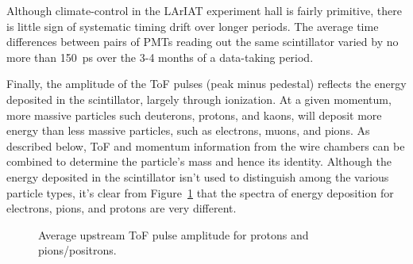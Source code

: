 Although climate-control in the LArIAT experiment hall is fairly primitive, there is little sign of systematic timing drift over longer periods. The average time differences between pairs of PMTs reading out the same scintillator varied by no more than 150~ps over the 3-4 months of a data-taking period.

Finally, the amplitude of the ToF pulses (peak minus pedestal) reflects the energy deposited in the scintillator, largely through ionization.  At a given momentum, more massive particles such deuterons, protons, and kaons, will deposit more energy than less massive particles, such as electrons, muons, and pions. As described below, ToF and momentum information from the wire chambers can be combined to determine the particle's mass and hence its identity. Although the energy deposited in the scintillator isn't used to distinguish among the various particle types, it's clear from Figure~\ref{fig:tofamplitude} that the spectra of energy deposition for
electrons, pions, and protons are very different.

\begin{figure}[!h]
\begin{centering}
\vspace{-0.3cm}
\caption{
{\scriptsize \sf Average upstream ToF pulse amplitude for protons and pions/positrons.}
}
\label{fig:tofamplitude}
\end{centering}
\end{figure}

